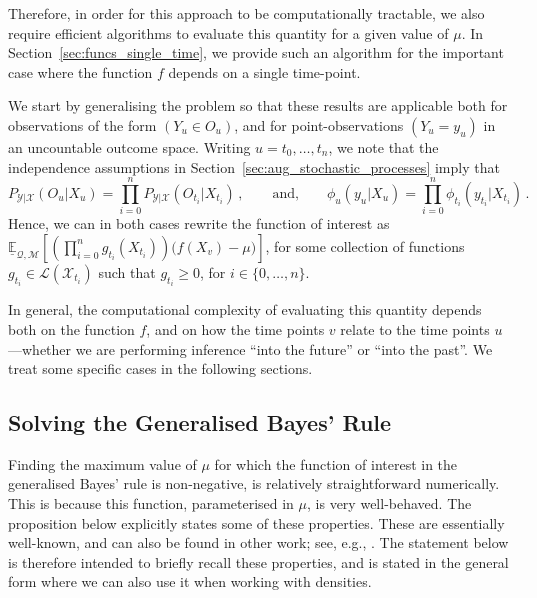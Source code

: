 \documentclass[twoside,11pt]{article}
\newcommand{\states}{\mathcal{X}}
\newcommand{\observs}{\mathcal{Y}}
\newcommand{\lexp}{\underline{\mathbb{E}}_{\rateset,\mathcal{M}}}
\newcommand{\gambles}{\mathcal{L}}
\newcommand{\rateset}{\mathcal{Q}}
\begin{document}
Therefore, in order for this approach to be computationally tractable, we also require efficient algorithms to evaluate this quantity for a given value of $\mu$. In Section~\ref{sec:funcs_single_time}, we provide such an algorithm for the important case where the function $f$ depends on a single time-point.

We start by generalising the problem so that these results are applicable both for observations of the form $(Y_u\in O_u)$, and for point-observations $(Y_u=y_u)$ in an uncountable outcome space. Writing $u=t_0,\ldots,t_n$, we note that the independence assumptions in Section~\ref{sec:aug_stochastic_processes} imply that
\begin{equation*}
P_{\observs\vert\states}(O_u\vert X_u) = \prod_{i=0}^nP_{\observs\vert\states}(O_{t_i}\vert X_{t_i})\,,\quad\quad\text{and,}\quad\quad \phi_u(y_u\vert X_u) = \prod_{i=0}^n\phi_{t_i}(y_{t_i}\vert X_{t_i})\,.
\end{equation*}
Hence, we can in both cases rewrite the function of interest as
$\lexp\left[ \left(\prod_{i=0}^ng_{t_i}(X_{t_i})\right)\bigl(f(X_v) - \mu\bigr) \right]$,
for some collection of functions $g_{t_i}\in\gambles(\states_{t_i})$ such that $g_{t_i}\geq 0$, for $i\in\{0,\ldots,n\}$.

In general, the computational complexity of evaluating this quantity depends both on the function $f$, and on how the time points $v$ relate to the time points $u$---whether we are performing inference ``into the future'' or ``into the past''. We treat some specific cases in the following sections.

\subsection{Solving the Generalised Bayes' Rule}\label{sec:gbr}

Finding the maximum value of $\mu$ for which the function of interest in the generalised Bayes' rule is non-negative, is relatively straightforward numerically. This is because this function, parameterised in $\mu$, is very well-behaved. The proposition below explicitly states some of these properties. These are essentially well-known, and can also be found in other work; see, e.g., \cite[Section 2.7.3]{de2015credal}. The statement below is therefore intended to briefly recall these properties, and is stated in the general form where we can also use it when working with densities.
\end{document}
